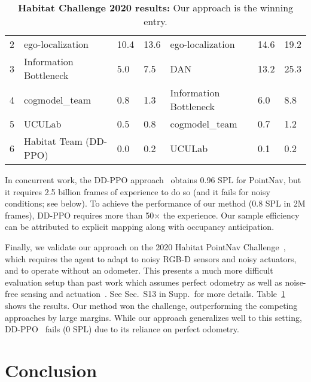 \documentclass[runningheads]{llncs}
\begin{document}
\begin{table}[!t]
\begin{minipage}{\linewidth}
{\begin{tabular}{@{}clp{1.5cm}p{1.5cm}lp{1.5cm}p{1.5cm}@{}}
    2    & ego-localization~\cite{datta2020egolocalization}           & 10.4   & 13.6       & ego-localization ~\cite{datta2020egolocalization}     & 14.6    & 19.2       \\
    3    & Information Bottleneck                                     & 5.0    & 7.5        & DAN~\cite{karkus2019differentiable}                   & 13.2    & 25.3       \\
    4    & cogmodel\_team                                             & 0.8    & 1.3        & Information Bottleneck                                & 6.0     & 8.8        \\
    5    & UCULab                                                     & 0.5    & 0.8        & cogmodel\_team                                        & 0.7     & 1.2        \\
    6    & Habitat Team (DD-PPO)~\cite{wijmans2019decentralized}      & 0.0    & 0.2        & UCULab                                                & 0.1     & 0.2        \\ \bottomrule
    \end{tabular}
    }
    \caption{\small \textbf{Habitat Challenge 2020 results:} Our approach is the winning entry.}
    \label{tab:habitat_challenge}
\end{minipage}
\end{table}



In concurrent work, the DD-PPO approach~\cite{wijmans2019decentralized} obtains 0.96 SPL for PointNav, but it requires 2.5 billion frames of experience to do so (and it fails for noisy conditions; see below). To achieve the performance of our method (0.8 SPL in 2M frames), DD-PPO requires more than 50$\times$ the experience. Our sample efficiency can be attributed to explicit mapping along with occupancy anticipation. 

Finally, we validate our approach on the 2020 Habitat PointNav Challenge~\cite{habitat-challenge}, which requires the agent to adapt to noisy RGB-D sensors and noisy actuators, and to operate without an odometer. This presents a much more difficult evaluation setup than past work which assumes perfect odometry as well as noise-free sensing and actuation~\cite{habitat19iccv,chaplot2020learning,wijmans2019decentralized}. See Sec.~S13 in Supp.~for more details. Table~\ref{tab:habitat_challenge} shows the results.
Our method won the challenge, outperforming the competing approaches by large margins. While our approach generalizes well to this setting, DD-PPO~\cite{wijmans2019decentralized} fails (0 SPL) due to its reliance on perfect odometry. \section{Conclusion}
\end{document}
